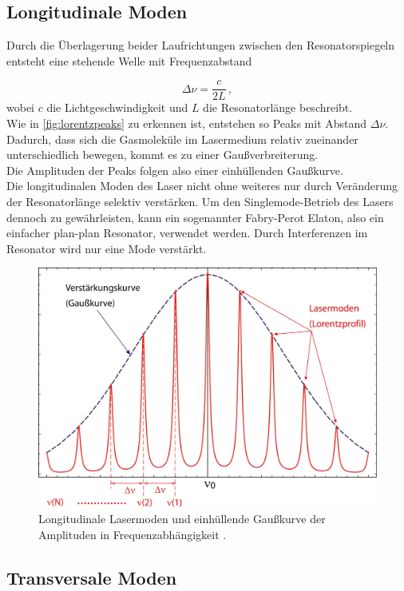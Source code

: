 \subsection{Longitudinale Moden}

Durch die Überlagerung beider Laufrichtungen zwischen den Resonatorspiegeln entsteht eine stehende Welle mit Frequenzabstand

\begin{equation}
    \Delta \nu = \frac{c}{2L} \,,
    \label{eq:freqdist}
\end{equation}
wobei $c$ die Lichtgeschwindigkeit und $L$ die Resonatorlänge beschreibt. \\
Wie in \autoref{fig:lorentzpeaks} zu erkennen ist, entstehen so Peaks mit Abstand $\Delta \nu$.
Dadurch, dass sich die Gasmoleküle im Lasermedium relativ zueinander unterschiedlich bewegen, kommt es zu einer Gaußverbreiterung. \\
Die Amplituden der Peaks folgen also einer einhüllenden Gaußkurve. \\
Die longitudinalen Moden des Laser nicht ohne weiteres nur durch Veränderung der Resonatorlänge selektiv verstärken.
Um den Singlemode-Betrieb des Lasers dennoch zu gewährleisten, kann ein sogenannter Fabry-Perot Elaton, also ein einfacher plan-plan Resonator, verwendet werden. 
Durch Interferenzen im Resonator wird nur eine Mode verstärkt.

\begin{figure}[H]
    \centering
    \includegraphics[width=.8\textwidth]{figures/LaserModes.pdf}
    \caption{Longitudinale Lasermoden und einhüllende Gaußkurve der Amplituden in Frequenzabhängigkeit \cite{wikilongmode}.}
    \label{fig:lorentzpeaks}
\end{figure}

\subsection{Transversale Moden}

